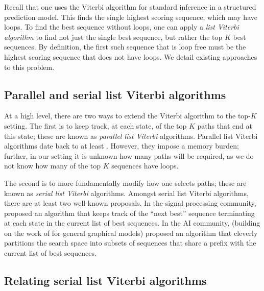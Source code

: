 

Recall that one uses the Viterbi algorithm for standard inference in a structured prediction model.
This finds the single highest scoring sequence, which may have loops.
To find the best sequence without loops, one can apply a \emph{list Viterbi algorithm}
to find not just the single best sequence,
but rather the top $K$ best sequences.
By definition, the first such sequence that is loop free must be the highest scoring sequence that does not have loops.
We detail existing approaches to this problem.

%
\subsection{Parallel and serial list Viterbi algorithms}

At a high level, there are two ways to extend the Viterbi algorithm to the top-$K$ setting.
The first is to keep track, at each state, of the top $K$ paths that end at this state; these are known as \emph{parallel list Viterbi} algorithms.
Parallel list Viterbi algorithms date back to at least \citet{Forney:1973}.
However, they impose a memory burden; further, in our setting it is unknown how many paths will be required, as we do not know how many of the top $K$ sequences have loops.

The second is to more fundamentally modify how one selects paths; these are known as \emph{serial list Viterbi} algorithms.
Amongst serial list Viterbi algorithms, there are at least two well-known proposals.
In the signal processing community, \citet{seshadri1994list} proposed an algorithm that keeps track of the ``next best'' sequence terminating at each state in the current list of best sequences.
In the AI community, \citet{nilsson2001sequentially} (building on the work of \citet{Nilsson:1998} for general graphical models) proposed an algorithm that cleverly partitions the search space into subsets of sequences that share a prefix with the current list of best sequences.


%
\subsection{Relating serial list Viterbi algorithms}

